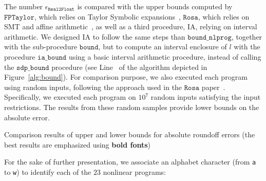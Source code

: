 \documentclass[preprint,fleqn,nocopyrightspace]{sigplanconf}
\newcommand{\code}[1]{\lstinline{#1}}
\newcommand{\nbenchs}{23}
\newcommand{\iabound}{\mathtt{ia\_bound}}
\newcommand{\sdpbound}{\mathtt{sdp\_bound}}
\newcommand{\bound}{\mathtt{bound}}
\newcommand{\boundnlprog}{\mathtt{bound\_nlprog}}
\newcommand{\realtofloat}{\mathtt{Real2Float}}
\newcommand{\rosa}{\mathtt{Rosa}}
\newcommand{\fptaylor}{\mathtt{FPTaylor}}
\theoremstyle{plain}
\begin{document}
The number $\epsilon_{\realtofloat}$ is compared with the upper bounds computed by $\fptaylor$, which relies on Taylor Symbolic expansions~\cite{fptaylor15}, $\rosa$, which relies on SMT and affine arithmetic~\cite{Darulova14Popl}, as well as a third procedure, IA, relying on interval arithmetic. We designed IA to follow the same steps than $\boundnlprog$, together with the sub-procedure $\bound$, but to compute an interval enclosure of $l$ with the procedure $\iabound$ using a basic interval arithmetic procedure, instead of calling the $\sdpbound$ procedure (see Line~ of the algorithm depicted in Figure~\ref{alg:bound}). For comparison purpose, we also executed each program using random inputs, following the approach used
in the $\rosa$ paper~\cite{Darulova14Popl}.  Specifically,
we executed each program on $10^7$ random inputs satisfying the input restrictions.  The results from these random
samples provide lower bounds on the absolute error.
%
\begin{table*}[!ht]
\begin{center}
\caption{Comparison results of upper and lower bounds for absolute roundoff errors (the best results are emphasized using \textbf{bold fonts})}

\label{table:error}
\end{center}
\end{table*}
%
For the sake of further presentation, we associate an alphabet character (from \code{a} to \code{w}) to identify each of the $\nbenchs$ nonlinear programs:
%
\end{document}
